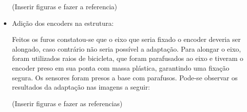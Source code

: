 \begin{itemize}
   			(Inserir figuras e fazer a referencia)

   	  \item Adição dos encoders na estrutura:


   		Feitos os furos constatou-se que o eixo que seria fixado o encoder deveria ser alongado, caso contrário não seria possível a adaptação. Para alongar o eixo, foram utilizados raios de bicicleta, que foram parafusados ao eixo e tiveram o encoder preso em sua ponta com massa plástica, garantindo uma fixação segura. Os sensores foram presos a base com parafusos. Pode-se observar os resultados da adaptação nas imagens a seguir:

   			(Inserir figuras e fazer as referencias)

   \end{itemize}
 		

